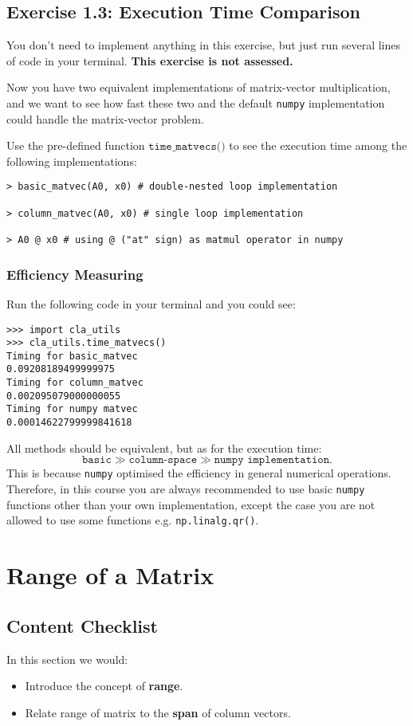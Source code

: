 \subsection*{Exercise 1.3: Execution Time Comparison}%
You don't need to implement anything in this exercise, but just run several lines of code in your terminal. \textbf{This exercise is not assessed.}
\begin{problem}
Now you have two equivalent implementations of matrix-vector multiplication, and we want to see how fast these two and the default \texttt{numpy} implementation could handle the matrix-vector problem. 

\noindent Use the pre-defined function $\texttt{time\_matvecs()}$ to see the execution time among the following implementations:
\begin{lstlisting}
> basic_matvec(A0, x0) # double-nested loop implementation

> column_matvec(A0, x0) # single loop implementation

> A0 @ x0 # using @ ("at" sign) as matmul operator in numpy
\end{lstlisting}
\end{problem}
\subsubsection*{Efficiency Measuring}
Run the following code in your terminal and you could see:
\begin{lstlisting}
>>> import cla_utils
>>> cla_utils.time_matvecs()
Timing for basic_matvec
0.09208189499999975
Timing for column_matvec
0.002095079000000055
Timing for numpy matvec
0.00014622799999841618
\end{lstlisting}
All methods should be equivalent, but as for the execution time:
\[
\texttt{basic} \gg \texttt{column-space} \gg \texttt{numpy implementation}
.\]
This is because \texttt{numpy} optimised the efficiency in general numerical operations. Therefore, in this course you are always recommended to use basic \texttt{numpy} functions other than your own implementation, except the case you are not allowed to use some functions e.g. \texttt{np.linalg.qr()}. \checked
\section{Range of a Matrix}%
\label{sec1.4}
\subsection*{Content Checklist}
\noindent In this section we would:
\begin{itemize}
  \item Introduce the concept of \textbf{range}.
  \item Relate range of matrix to the \textbf{span} of column vectors. 
\end{itemize}
